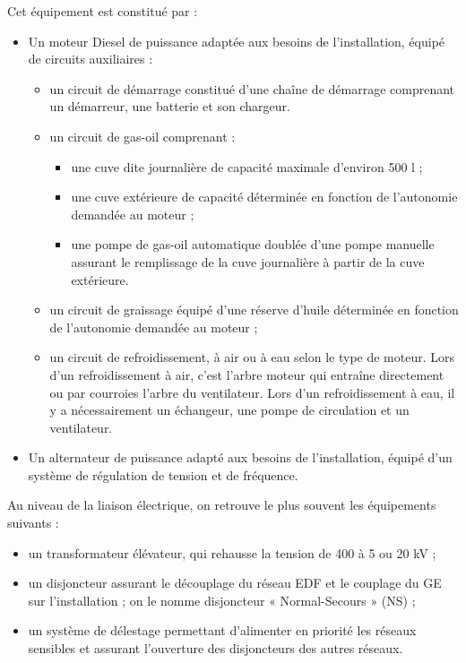 Cet équipement est constitué par :
\begin{itemize}

\item  Un moteur Diesel de puissance adaptée aux besoins de l’installation, équipé de circuits auxiliaires :
    \begin{itemize}
    \item  un circuit de démarrage constitué d’une chaîne de démarrage comprenant un démarreur, une batterie et son chargeur.
    \item  un circuit de gas-oil comprenant : 

        \begin{itemize}
        \item  une cuve dite journalière de capacité maximale d’environ 500 l ;
    	\item  une cuve extérieure de capacité déterminée en fonction de l’autonomie demandée au moteur ;
    	\item  une pompe de gas-oil automatique doublée d’une pompe manuelle assurant le remplissage de la cuve journalière à partir de la cuve extérieure.
        \end{itemize}
        
    \item  un circuit de graissage équipé d’une réserve d’huile déterminée en fonction de l’autonomie demandée au moteur ;
    \item  un circuit de refroidissement, à air ou à eau selon le type de moteur. Lors d’un refroidissement à air, c’est l’arbre moteur qui entraîne directement ou par courroies l’arbre du ventilateur. Lors d’un refroidissement à eau, il y a nécessairement un échangeur, une pompe de circulation et un ventilateur.

    \end{itemize}



\item  Un alternateur de puissance adapté aux besoins de l’installation, équipé d’un système de régulation de tension et de fréquence.
\end{itemize}



Au niveau de la liaison électrique, on retrouve le plus souvent les équipements suivants : 
\begin{itemize}

\item  un transformateur élévateur, qui rehausse la tension de 400 à 5 ou 20 kV ;
\item  un disjoncteur assurant le découplage du réseau EDF et le couplage du GE sur l’installation ; on le nomme disjoncteur « Normal-Secours » (NS) ;
\item  un système de délestage permettant d’alimenter en priorité les réseaux sensibles et assurant l’ouverture des disjoncteurs des autres réseaux.


\end{itemize}

